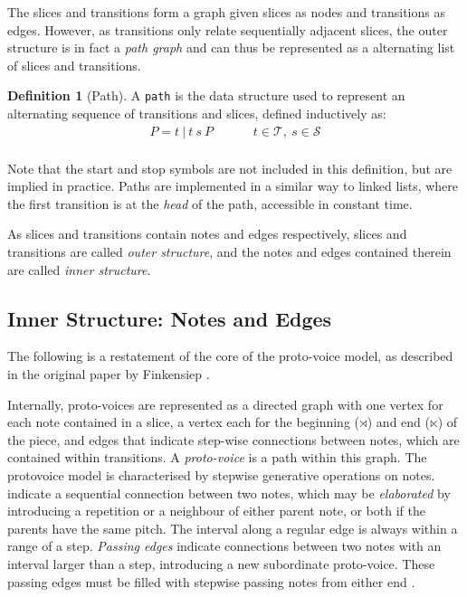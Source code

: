 \documentclass[12pt,a4paper,twoside,openany]{report} \usepackage[pdfborder={0 0 0}]{hyperref}    %
\theoremstyle{definition} \newtheorem{definition}{Definition}[section]
\begin{document}
  The slices and transitions form a graph given slices as nodes and transitions as edges.
  However, as transitions only relate sequentially adjacent slices, the outer structure is in fact a \textit{path graph}
  and can thus be represented as a alternating list of slices and transitions.

  \begin{definition}[Path] A \texttt{path} is the data structure used to represent an alternating sequence of
    transitions and slices, defined inductively as:
      \begin{equation} 
        \begin{aligned} 
          P = t~|~t~s~P  &&&& t \in \mathcal{T},~s \in \mathcal{S}\\ 
        \end{aligned}
      \label{eq:pathGraph} 
      \end{equation} 
      \label{def:pathGraph} 
    \end{definition}
  Note that the start and stop symbols are not included in this definition, but are implied in practice. Paths are
  implemented in a similar way to linked lists, where the first transition is at the \textit{head} of the path, accessible in constant time.

\par As slices and transitions contain notes and edges respectively, slices and transitions are called \textit{outer
structure}, and the notes and edges contained therein are called \textit{inner structure}.

\subsection{Inner Structure: Notes and Edges} 
\label{sub:Inner Structure}
The following is a restatement of the core of the proto-voice model,  as described in the original paper by Finkensiep \cite{finkensiepModelingInferringProtovoice2021}.

Internally, proto-voices are represented as a directed graph with one vertex for each note contained in a slice,
a vertex each for the beginning ($\rtimes$) and end ($\ltimes$) of the piece, and edges that indicate step-wise
connections between notes, which are contained within transitions. 
A \textit{proto-voice} is a path within this graph. The protovoice model is characterised by stepwise generative operations on notes. 
 indicate a sequential connection between two notes, which may be \textit{elaborated} by introducing a repetition or a neighbour of either parent note, or both if the parents have the same pitch. 
The interval along a regular edge is always within a range of a step.
\textit{Passing edges} indicate connections between two notes with an interval larger than a step, introducing a new subordinate proto-voice. 
These passing edges must be filled with stepwise passing notes from either end \cite{finkensiepModelingInferringProtovoice2021}.
\end{document}
